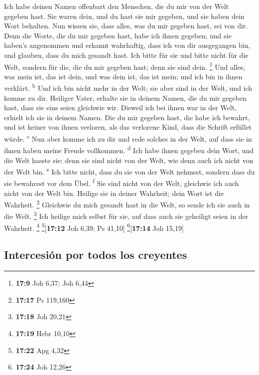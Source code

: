 Ich habe deinen Namen offenbart den Menschen, die du mir
von der Welt gegeben hast. Sie waren dein, und du hast sie mir gegeben,
und sie haben dein Wort behalten.  Nun wissen sie, dass
alles, was du mir gegeben hast, sei von dir.  Denn die
Worte, die du mir gegeben hast, habe ich ihnen gegeben; und sie haben's
angenommen und erkannt wahrhaftig, dass ich von dir ausgegangen bin, und
glauben, dass du mich gesandt hast.  Ich bitte für sie und
bitte nicht für die Welt, sondern für die, die du mir gegeben hast; denn
sie sind dein. \footnote{\textbf{17:9} Joh 6,37; Joh 6,44}
 Und alles, was mein ist, das ist dein, und was dein ist,
das ist mein; und ich bin in ihnen verklärt. \textsuperscript{b}
 Und ich bin nicht mehr in der Welt; sie aber sind in der
Welt, und ich komme zu dir. Heiliger Vater, erhalte sie in deinem Namen,
die du mir gegeben hast, dass sie eins seien gleichwie wir.
 Dieweil ich bei ihnen war in der Welt, erhielt ich sie
in deinem Namen. Die du mir gegeben hast, die habe ich bewahrt, und ist
keiner von ihnen verloren, als das verlorene Kind, dass die Schrift
erfüllet würde. \textsuperscript{c}  Nun aber komme ich
zu dir und rede solches in der Welt, auf dass sie in ihnen haben meine
Freude vollkommen. \textsuperscript{d}  Ich habe ihnen
gegeben dein Wort, und die Welt hasste sie; denn sie sind nicht von der
Welt, wie denn auch ich nicht von der Welt bin. \textsuperscript{e}
 Ich bitte nicht, dass du sie von der Welt nehmest,
sondern dass du sie bewahrest vor dem Übel. \textsuperscript{f}
 Sie sind nicht von der Welt, gleichwie ich auch nicht
von der Welt bin.  Heilige sie in deiner Wahrheit; dein
Wort ist die Wahrheit. \footnote{\textbf{17:17} Ps 119,160}
 Gleichwie du mich gesandt hast in die Welt, so sende ich
sie auch in die Welt. \footnote{\textbf{17:18} Joh 20,21}
 Ich heilige mich selbst für sie, auf dass auch sie
geheiligt seien in der Wahrheit. \footnote{\textbf{17:19} Hebr 10,10}
\footnote{\textbf{17:22} Apg 4,32}{[}\textbf{17:12} Joh 6,39; Ps
41,10{]} \footnote{\textbf{17:24} Joh 12,26}{[}\textbf{17:14} Joh
15,19{]}

\hypertarget{intercesiuxf3n-por-todos-los-creyentes}{%
\subsection{Intercesión por todos los
creyentes}\label{intercesiuxf3n-por-todos-los-creyentes}}


